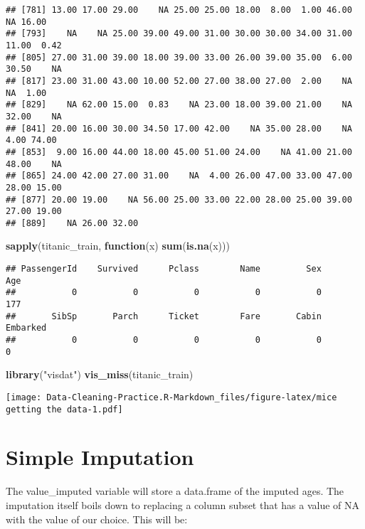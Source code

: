\documentclass[
]{article}
\newenvironment{Shaded}{\begin{snugshade}}{\end{snugshade}}
\newcommand{\ControlFlowTok}[1]{\textcolor[rgb]{0.13,0.29,0.53}{\textbf{#1}}}
\newcommand{\FunctionTok}[1]{\textcolor[rgb]{0.13,0.29,0.53}{\textbf{#1}}}
\newcommand{\NormalTok}[1]{#1}
\newcommand{\StringTok}[1]{\textcolor[rgb]{0.31,0.60,0.02}{#1}}
\begin{document}
\begin{verbatim}
## [781] 13.00 17.00 29.00    NA 25.00 25.00 18.00  8.00  1.00 46.00    NA 16.00
## [793]    NA    NA 25.00 39.00 49.00 31.00 30.00 30.00 34.00 31.00 11.00  0.42
## [805] 27.00 31.00 39.00 18.00 39.00 33.00 26.00 39.00 35.00  6.00 30.50    NA
## [817] 23.00 31.00 43.00 10.00 52.00 27.00 38.00 27.00  2.00    NA    NA  1.00
## [829]    NA 62.00 15.00  0.83    NA 23.00 18.00 39.00 21.00    NA 32.00    NA
## [841] 20.00 16.00 30.00 34.50 17.00 42.00    NA 35.00 28.00    NA  4.00 74.00
## [853]  9.00 16.00 44.00 18.00 45.00 51.00 24.00    NA 41.00 21.00 48.00    NA
## [865] 24.00 42.00 27.00 31.00    NA  4.00 26.00 47.00 33.00 47.00 28.00 15.00
## [877] 20.00 19.00    NA 56.00 25.00 33.00 22.00 28.00 25.00 39.00 27.00 19.00
## [889]    NA 26.00 32.00
\end{verbatim}

\begin{Shaded}
\begin{Highlighting}[]
\FunctionTok{sapply}\NormalTok{(titanic\_train, }\ControlFlowTok{function}\NormalTok{(x) }\FunctionTok{sum}\NormalTok{(}\FunctionTok{is.na}\NormalTok{(x)))}
\end{Highlighting}
\end{Shaded}

\begin{verbatim}
## PassengerId    Survived      Pclass        Name         Sex         Age 
##           0           0           0           0           0         177 
##       SibSp       Parch      Ticket        Fare       Cabin    Embarked 
##           0           0           0           0           0           0
\end{verbatim}

\begin{Shaded}
\begin{Highlighting}[]
\FunctionTok{library}\NormalTok{(}\StringTok{"visdat"}\NormalTok{)}
\FunctionTok{vis\_miss}\NormalTok{(titanic\_train)}
\end{Highlighting}
\end{Shaded}

\texttt{[image: Data-Cleaning-Practice.R-Markdown\_files/figure-latex/mice getting the data-1.pdf]}

\hypertarget{simple-imputation}{%
\section{Simple Imputation}\label{simple-imputation}}

The value\_imputed variable will store a data.frame of the imputed ages.
The imputation itself boils down to replacing a column subset that has a
value of NA with the value of our choice. This will be:
\end{document}
